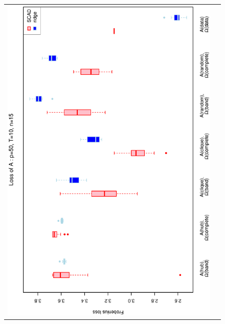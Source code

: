 \begin{figure}[h!]
\centering
\begin{tabular}{cc}
\includegraphics[scale=0.45,angle=270]{LossA50T10N15_5.eps}
\\

\end{tabular}
\end{figure}
